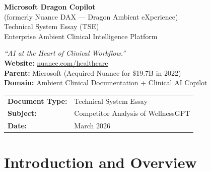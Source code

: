 \documentclass[12pt,a4paper]{article}
\begin{document}
\begin{titlepage}
    \centering\vspace*{2cm}
    {\Huge\bfseries\color{msblue} Microsoft Dragon Copilot}\\[0.3cm]
    {\normalsize\color{darkgray}(formerly Nuance DAX --- Dragon Ambient eXperience)}\\[0.5cm]
    {\Large\color{msorange} Technical System Essay (TSE)}\\[0.3cm]
    {\large\color{darkgray} Enterprise Ambient Clinical Intelligence Platform}\\[2cm]
    \begin{mdframed}[backgroundcolor=lightgray,linecolor=msblue,linewidth=1.5pt,roundcorner=5pt]
        \centering\vspace{0.3cm}
        \textit{``AI at the Heart of Clinical Workflow.''}\\[0.3cm]
        \textbf{Website:} \href{https://nuance.com/healthcare}{nuance.com/healthcare}\\
        \textbf{Parent:} Microsoft (Acquired Nuance for \$19.7B in 2022)\\
        \textbf{Domain:} Ambient Clinical Documentation + Clinical AI Copilot\\\vspace{0.3cm}
    \end{mdframed}
    \vspace{2cm}
    \begin{tabular}{ll}
        \textbf{Document Type:} & Technical System Essay \\
        \textbf{Subject:} & Competitor Analysis of WellnessGPT \\
        \textbf{Date:} & March 2026 \\
    \end{tabular}
\end{titlepage}

\tableofcontents\newpage

\begin{abstract}
\noindent This TSE analyses \textbf{Microsoft Dragon Copilot} (formerly Nuance DAX) as a major competitor to WellnessGPT. It is the world's most widely deployed ambient clinical AI, combining Microsoft Azure, OpenAI's GPT-4, and Nuance's decades of medical speech recognition into a unified enterprise AI platform.
\end{abstract}\newpage

\section{Introduction and Overview}
\end{document}
